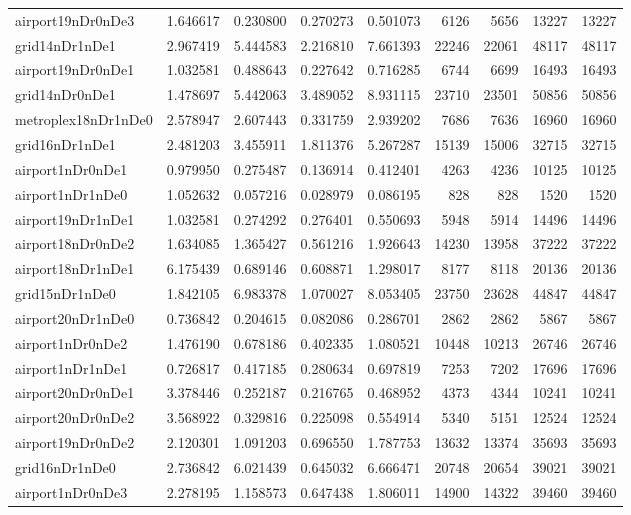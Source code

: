 \begin{longtable}{|l|r|r|r|r|r|r|r|r|}
airport19nDr0nDe3 & 1.646617 & 0.230800 & 0.270273 & 0.501073 & 6126 & 5656 & 13227 & 13227 \\
grid14nDr1nDe1 & 2.967419 & 5.444583 & 2.216810 & 7.661393 & 22246 & 22061 & 48117 & 48117 \\
airport19nDr0nDe1 & 1.032581 & 0.488643 & 0.227642 & 0.716285 & 6744 & 6699 & 16493 & 16493 \\
grid14nDr0nDe1 & 1.478697 & 5.442063 & 3.489052 & 8.931115 & 23710 & 23501 & 50856 & 50856 \\
metroplex18nDr1nDe0 & 2.578947 & 2.607443 & 0.331759 & 2.939202 & 7686 & 7636 & 16960 & 16960 \\
grid16nDr1nDe1 & 2.481203 & 3.455911 & 1.811376 & 5.267287 & 15139 & 15006 & 32715 & 32715 \\
airport1nDr0nDe1 & 0.979950 & 0.275487 & 0.136914 & 0.412401 & 4263 & 4236 & 10125 & 10125 \\
airport1nDr1nDe0 & 1.052632 & 0.057216 & 0.028979 & 0.086195 & 828 & 828 & 1520 & 1520 \\
airport19nDr1nDe1 & 1.032581 & 0.274292 & 0.276401 & 0.550693 & 5948 & 5914 & 14496 & 14496 \\
airport18nDr0nDe2 & 1.634085 & 1.365427 & 0.561216 & 1.926643 & 14230 & 13958 & 37222 & 37222 \\
airport18nDr1nDe1 & 6.175439 & 0.689146 & 0.608871 & 1.298017 & 8177 & 8118 & 20136 & 20136 \\
grid15nDr1nDe0 & 1.842105 & 6.983378 & 1.070027 & 8.053405 & 23750 & 23628 & 44847 & 44847 \\
airport20nDr1nDe0 & 0.736842 & 0.204615 & 0.082086 & 0.286701 & 2862 & 2862 & 5867 & 5867 \\
airport1nDr0nDe2 & 1.476190 & 0.678186 & 0.402335 & 1.080521 & 10448 & 10213 & 26746 & 26746 \\
airport1nDr1nDe1 & 0.726817 & 0.417185 & 0.280634 & 0.697819 & 7253 & 7202 & 17696 & 17696 \\
airport20nDr0nDe1 & 3.378446 & 0.252187 & 0.216765 & 0.468952 & 4373 & 4344 & 10241 & 10241 \\
airport20nDr0nDe2 & 3.568922 & 0.329816 & 0.225098 & 0.554914 & 5340 & 5151 & 12524 & 12524 \\
airport19nDr0nDe2 & 2.120301 & 1.091203 & 0.696550 & 1.787753 & 13632 & 13374 & 35693 & 35693 \\
grid16nDr1nDe0 & 2.736842 & 6.021439 & 0.645032 & 6.666471 & 20748 & 20654 & 39021 & 39021 \\
airport1nDr0nDe3 & 2.278195 & 1.158573 & 0.647438 & 1.806011 & 14900 & 14322 & 39460 & 39460 \\

\end{longtable}
